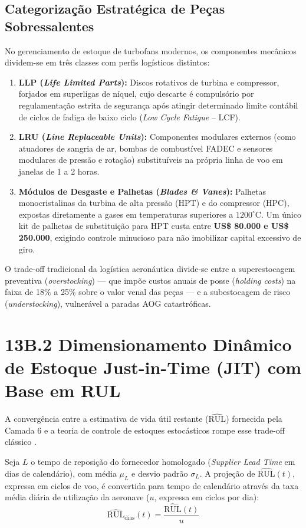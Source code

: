 \subsection{Categorização Estratégica de Peças Sobressalentes}
No gerenciamento de estoque de turbofans modernos, os componentes mecânicos dividem-se em três classes com perfis logísticos distintos:
\begin{enumerate}
    \item \textbf{LLP (\textit{Life Limited Parts}):} Discos rotativos de turbina e compressor, forjados em superligas de níquel, cujo descarte é compulsório por regulamentação estrita de segurança após atingir determinado limite contábil de ciclos de fadiga de baixo ciclo (\textit{Low Cycle Fatigue} -- LCF).
    \item \textbf{LRU (\textit{Line Replaceable Units}):} Componentes modulares externos (como atuadores de sangria de ar, bombas de combustível FADEC e sensores modulares de pressão e rotação) substituíveis na própria linha de voo em janelas de 1 a 2 horas.
    \item \textbf{Módulos de Desgaste e Palhetas (\textit{Blades \& Vanes}):} Palhetas monocristalinas da turbina de alta pressão (HPT) e do compressor (HPC), expostas diretamente a gases em temperaturas superiores a $1200^\circ\text{C}$. Um único kit de palhetas de substituição para HPT custa entre \textbf{US\$ 80.000 e US\$ 250.000}, exigindo controle minucioso para não imobilizar capital excessivo de giro.
\end{enumerate}

O trade-off tradicional da logística aeronáutica divide-se entre a superestocagem preventiva (\textit{overstocking}) --- que impõe custos anuais de posse (\textit{holding costs}) na faixa de 18\% a 25\% sobre o valor venal das peças --- e a subestocagem de risco (\textit{understocking}), vulnerável a paradas AOG catastróficas.

\section{13B.2 Dimensionamento Dinâmico de Estoque Just-in-Time (JIT) com Base em RUL}
A convergência entre a estimativa de vida útil restante ($\widehat{\text{RUL}}$) fornecida pela Camada 6 e a teoria de controle de estoques estocásticos rompe esse trade-off clássico \cite{vanhorenbeek2013}.

Seja $L$ o tempo de reposição do fornecedor homologado (\textit{Supplier Lead Time} em dias de calendário), com média $\mu_L$ e desvio padrão $\sigma_L$. A projeção de $\widehat{\text{RUL}}(t)$, expressa em ciclos de voo, é convertida para tempo de calendário através da taxa média diária de utilização da aeronave ($u$, expressa em ciclos por dia):
$$\widehat{\text{RUL}}_{\text{dias}}(t) = \frac{\widehat{\text{RUL}}(t)}{u}$$


